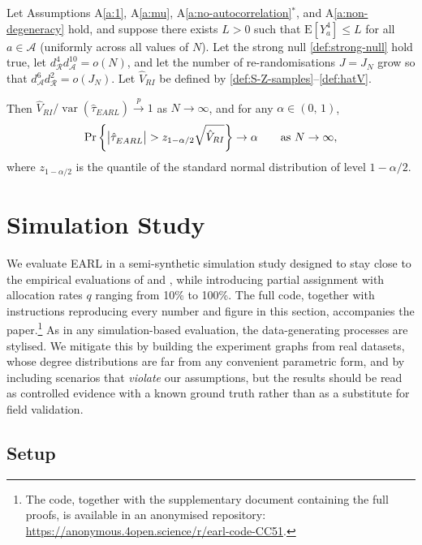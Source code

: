 \documentclass[sigconf,anonymous,review]{acmart}
\newcounter{assumption}
\newcommand{\E}{\mathrm E}
\DeclareMathOperator{\var}{var}
\begin{document}
\begin{theorem}\label{th:randomisation-inference}
    Let Assumptions A\ref{a:1}, A\ref{a:mu}, A\ref{a:no-autocorrelation}$^*$, and A\ref{a:non-degeneracy} hold, and suppose there exists $L>0$ such that $\E[Y_a^4] \le L$ for all $a\in\mathcal A$ (uniformly across all values of $N$). Let the strong null \eqref{def:strong-null} hold true, let $d^{4}_{\mathcal{R}}d^{10}_{\mathcal{A}}=o(N)$, and let the number of re-randomisations $J=J_N$ grow so that $d^{6}_{\mathcal{A}}d^{2}_{\mathcal{R}}=o(J_N)$. Let $\hat V_{RI}$ be defined by \eqref{def:S-Z-samples}--\eqref{def:hatV}.

    Then $\hat V_{RI} / \var(\hat\tau^{\phantom{1}}_{EARL})\stackrel{p}{\to} 1$ as $N\to\infty$, and
    for any $\alpha\in(0,\,1)$,
    \begin{equation*}
        \Pr\left\{\left|\hat\tau^{\phantom{1}}_{EARL}\right| > z_{1-\alpha/2}\sqrt{\hat V_{RI}}\right\}\to \alpha \qquad \textup{as }N\to\infty,
    \end{equation*}
    where $z_{1-\alpha/2}$ is the quantile of the standard normal distribution of level $1-\alpha/2$.
\end{theorem}

\section{Simulation Study}\label{sec:simulations}

We evaluate EARL in a semi-synthetic simulation study designed to stay close to the empirical evaluations of \citet{doudchenko2020causal} and \citet{harshaw2023erl}, while introducing partial assignment with allocation rates $q$ ranging from 10\% to 100\%. The full code, together with instructions reproducing every number and figure in this section, accompanies the paper.\footnote{The code, together with the supplementary document containing the full proofs, is available in an anonymised repository: \url{https://anonymous.4open.science/r/earl-code-CC51}.} As in any simulation-based evaluation, the data-generating processes are stylised. We mitigate this by building the experiment graphs from real datasets, whose degree distributions are far from any convenient parametric form, and by including scenarios that \emph{violate} our assumptions, but the results should be read as controlled evidence with a known ground truth rather than as a substitute for field validation.

\subsection{Setup}\label{subsec:sim-setup}
\end{document}
